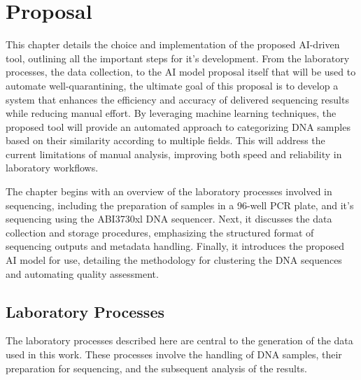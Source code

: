 
%

\makeatletter
\newcommand{\ntifpkgloaded}{%
  \@ifpackageloaded%
}
\makeatother


\chapter{Proposal}
\label{cha:Proposal}


This chapter details the choice and implementation of the proposed AI-driven tool, outlining all the important steps for it's development. From the laboratory processes, the data collection, to the AI model proposal itself that will be used to automate well-quarantining, the ultimate goal of this proposal is to develop a system that enhances the efficiency and accuracy of delivered sequencing results while reducing manual effort. By leveraging machine learning techniques, the proposed tool will provide an automated approach to categorizing DNA samples based on their similarity according to multiple fields. This will address the current limitations of manual analysis, improving both speed and reliability in laboratory workflows.

The chapter begins with an overview of the laboratory processes involved in sequencing, including the preparation of samples in a 96-well PCR plate, and it's sequencing using the ABI3730xl DNA sequencer. Next, it discusses the data collection and storage procedures, emphasizing the structured format of sequencing outputs and metadata handling. Finally, it introduces the proposed AI model for use, detailing the methodology for clustering the DNA sequences and automating quality assessment.

\section{Laboratory Processes}
\label{sec:laboratory}

The laboratory processes described here are central to the generation of the data used in this work. These processes involve the handling of DNA samples, their preparation for sequencing, and the subsequent analysis of the results.

